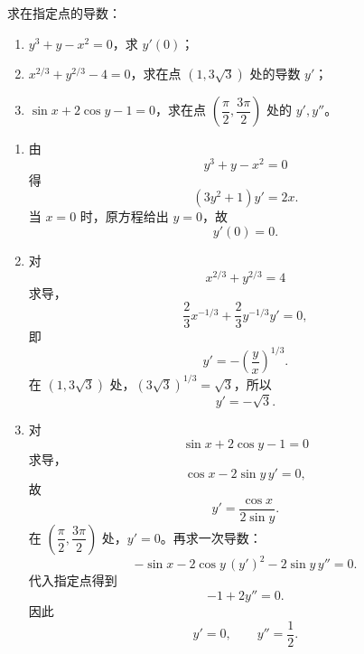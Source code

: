 \begin{xexercise}[2]
求在指定点的导数：
  \begin{enumerate}[label=(\arabic*)]
    \item $y^3+y-x^2=0$，求 $y'(0)$；
    \item $x^{2/3}+y^{2/3}-4=0$，求在点 $(1,3\sqrt3)$ 处的导数 $y'$；
    \item $\sin x+2\cos y-1=0$，求在点 $\left(\dfrac\pi2,\dfrac{3\pi}{2}\right)$ 处的 $y',y''$。
  \end{enumerate}
\end{xexercise}
\begin{xsolution}
\begin{enumerate}[label=(\arabic*)]
  \item 由
  \[
    y^3+y-x^2=0
  \]
  得
  \[
    (3y^2+1)y'=2x.
  \]
  当 $x=0$ 时，原方程给出 $y=0$，故
  \[
    \boxed{y'(0)=0}.
  \]

  \item 对
  \[
    x^{2/3}+y^{2/3}=4
  \]
  求导，
  \[
    \frac23x^{-1/3}+\frac23y^{-1/3}y'=0,
  \]
  即
  \[
    y'=-\left(\frac yx\right)^{1/3}.
  \]
  在 $(1,3\sqrt3)$ 处，$(3\sqrt3)^{1/3}=\sqrt3$，所以
  \[
    \boxed{y'=-\sqrt3}.
  \]

  \item 对
  \[
    \sin x+2\cos y-1=0
  \]
  求导，
  \[
    \cos x-2\sin y\,y'=0,
  \]
  故
  \[
    y'=\frac{\cos x}{2\sin y}.
  \]
  在 $\left(\dfrac\pi2,\dfrac{3\pi}2\right)$ 处，$y'=0$。再求一次导数：
  \[
    -\sin x-2\cos y\,(y')^2-2\sin y\,y''=0.
  \]
  代入指定点得到
  \[
    -1+2y''=0.
  \]
  因此
  \[
    \boxed{y'=0,\qquad y''=\frac12}.
  \]
\end{enumerate}
\end{xsolution}



